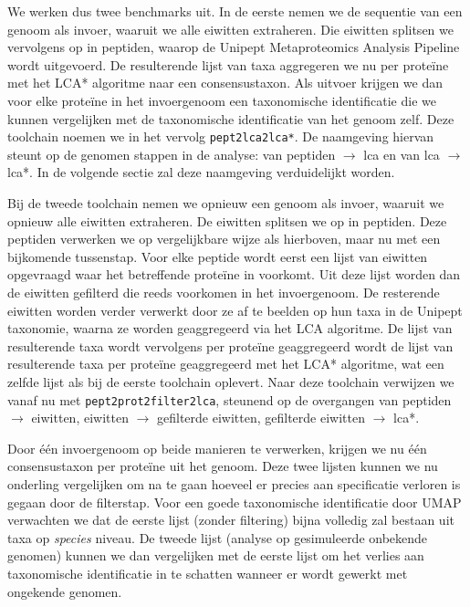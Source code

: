 We werken dus twee benchmarks uit. In de eerste nemen we de sequentie van een
genoom als invoer, waaruit we alle eiwitten extraheren. Die eiwitten splitsen
we vervolgens op in peptiden, waarop de Unipept Metaproteomics Analysis Pipeline
wordt uitgevoerd. De resulterende lijst van taxa aggregeren we nu per proteïne
met het LCA* algoritme naar een consensustaxon. Als uitvoer krijgen we dan voor
elke proteïne in het invoergenoom een taxonomische identificatie die we kunnen
vergelijken met de taxonomische identificatie van het genoom zelf. Deze
toolchain noemen we in het vervolg \texttt{pept2lca2lca*}. De naamgeving hiervan
steunt op de genomen stappen in de analyse: van peptiden $\rightarrow$ lca en
van lca $\rightarrow$ lca*. In de volgende sectie zal deze naamgeving
verduidelijkt worden.

Bij de tweede toolchain nemen we opnieuw een genoom als invoer, waaruit we
opnieuw alle eiwitten extraheren. De eiwitten splitsen we op in peptiden. Deze
peptiden verwerken we op vergelijkbare wijze als hierboven, maar nu met een
bijkomende tussenstap. Voor elke peptide wordt eerst een lijst van eiwitten
opgevraagd waar het betreffende proteïne in voorkomt. Uit deze lijst worden dan
de eiwitten gefilterd die reeds voorkomen in het invoergenoom. De resterende
eiwitten worden verder verwerkt door ze af te beelden op hun taxa in de Unipept
taxonomie, waarna ze worden geaggregeerd via het LCA algoritme. De lijst van
resulterende taxa wordt vervolgens per proteïne geaggregeerd wordt de lijst van
resulterende taxa per proteïne geaggregeerd met het LCA* algoritme, wat een
zelfde lijst als bij de eerste toolchain oplevert. Naar deze toolchain verwijzen
we vanaf nu met \texttt{pept2prot2filter2lca}, steunend op de overgangen van
peptiden $\rightarrow$ eiwitten, eiwitten $\rightarrow$ gefilterde eiwitten,
gefilterde eiwitten $\rightarrow$ lca*.

Door één invoergenoom op beide manieren te verwerken, krijgen we nu één
consensustaxon per proteïne uit het genoom. Deze twee lijsten kunnen we nu
onderling vergelijken om na te gaan hoeveel er precies aan specificatie verloren
is gegaan door de filterstap. Voor een goede taxonomische identificatie door
UMAP verwachten we dat de eerste lijst (zonder filtering) bijna volledig zal
bestaan uit taxa op \textit{species} niveau. De tweede lijst (analyse op
gesimuleerde onbekende genomen) kunnen we dan vergelijken met de eerste lijst om
het verlies aan taxonomische identificatie in te schatten wanneer er wordt
gewerkt met ongekende genomen.

